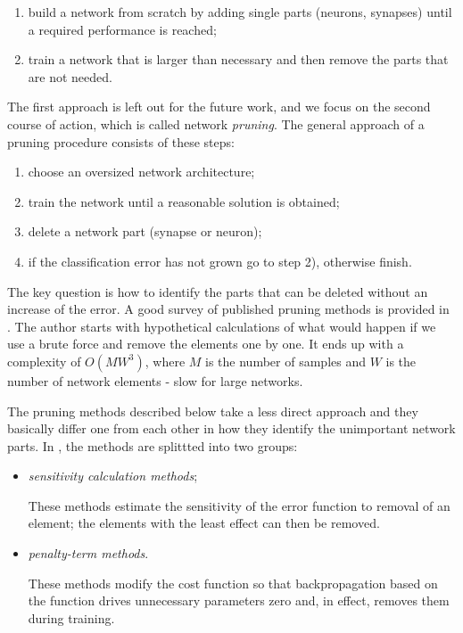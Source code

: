 \begin{enumerate}
\item build a network from scratch by adding single parts (neurons, synapses) until a required performance is reached;
\item train a network that is larger than necessary and then remove the parts that are not needed.
\end{enumerate}

The first approach is left out for the future work, and we focus on the second course of action, which is called network \textit{pruning}. The general approach of a pruning procedure consists of these steps:

\begin{enumerate}
\item choose an oversized network architecture;
\item train the network until a reasonable solution is obtained;
\item delete a network part (synapse or neuron);
\item if the classification error has not grown go to step 2), otherwise finish.
\end{enumerate}

The key question is how to identify the parts that can be deleted without an increase of the error. A good survey of published pruning methods is provided in \citep{reed:pa_survey}. The author starts with hypothetical calculations of what would happen if we use a brute force and remove the elements one by one. It ends up with a complexity of $ O(MW^3) $, where $ M $ is the number of samples and $ W $ is the number of network elements - slow for large networks. 

The pruning methods described below take a less direct approach and they basically differ one from each other in how they identify the unimportant network parts. In \citep{reed:pa_survey}, the methods are splittted into two groups:
\begin{itemize}
\item \textit{sensitivity calculation methods};

These methods estimate the sensitivity of the error function to removal of an element; the elements with the least effect can then be removed.
 
\item \textit{penalty-term methods}.

These methods modify the cost function so that backpropagation based on the function drives unnecessary parameters zero and, in effect, removes them during training.
\end{itemize}

